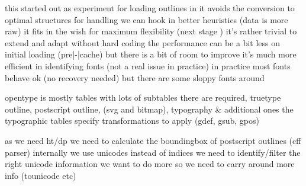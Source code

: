     \startitemize
        \startitem
            this started out as experiment for loading outlines in \MetaFun
        \stopitem
        \startitem
            it avoids the conversion to optimal structures for handling
        \stopitem
        \startitem
            we can hook in better heuristics (data is more raw)
        \stopitem
        \startitem
            it fits in the wish for maximum flexibility (next stage \ConTeXt)
        \stopitem
        \startitem
            it's rather trivial to extend and adapt without hard coding
        \stopitem
        \startitem
            the performance can be a bit less on initial loading (pre|-|cache)
            but there is a bit of room to improve
        \stopitem
        \startitem
            it's much more efficient in identifying fonts (not a real issue in
            practice)
        \stopitem
        \startitem
            in practice most fonts behave ok (no recovery needed) but there are
            some sloppy fonts around
        \stopitem
    \stopitemize

\stopsubject

\stoptitle

\starttitle[title={what do we load}]

\startsubject[title={tables}]

    \startitemize
        \startitem
            opentype is mostly tables with lots of subtables
        \stopitem
        \startitem
            there are required, truetype outline, postscript outline, (svg and
            bitmap), typography & additional ones
        \stopitem
        \startitem
            the typographic tables specify transformations to apply (gdef, gsub,
            gpos)
        \stopitem
    \stopitemize

\stopsubject

\startsubject[title={calculations}]

    \startitemize
        \startitem
            as we need ht/dp we need to calculate the boundingbox of postscript
            outlines (cff parser)
        \stopitem
        \startitem
            internally we use unicodes instead of indices
        \stopitem
        \startitem
            we need to identify/filter the right unicode information
        \stopitem
        \startitem
            we want to do more so we need to carry around more info (tounicode etc)
        \stopitem
    \stopitemize

\stopsubject

\startsubject[title={pitfalls}]

